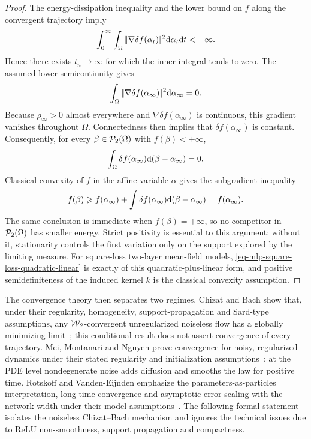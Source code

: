 \begin{proof}
	The energy-dissipation inequality and the lower bound on $f$ along the convergent trajectory imply
	\[
		\int_0^\infty
		\int_\Omega|\!| \nabla\delta f(\alpha_t) |\!|^2\mathrm{d}\alpha_t\mathrm{d} t
		<+\infty.
	\]
	Hence there exists $t_n\to\infty$ for which the inner integral tends to zero. The assumed lower semicontinuity gives
	\[
		\int_\Omega |\!| \nabla \delta f(\alpha_\infty) |\!|^2\mathrm{d}\alpha_\infty=0.
	\]
	Because $\rho_\infty>0$ almost everywhere and $\nabla\delta f(\alpha_\infty)$ is continuous, this gradient vanishes throughout $\Omega$. Connectedness then implies that $\delta f(\alpha_\infty)$ is constant. Consequently, for every $\beta\in\mathcal{P}_2(\Omega)$ with $f(\beta)<+\infty$,
	\[
		\int_\Omega\delta f(\alpha_\infty)\mathrm{d}(\beta-\alpha_\infty)=0.
	\]
	Classical convexity of $f$ in the affine variable $\alpha$ gives the subgradient inequality
	\[
		f(\beta)\geqslant f(\alpha_\infty)
		+
		\int \delta f(\alpha_\infty)\mathrm{d}(\beta-\alpha_\infty)
		= f(\alpha_\infty).
	\]
	The same conclusion is immediate when $f(\beta)=+\infty$, so no competitor in $\mathcal{P}_2(\Omega)$ has smaller energy. Strict positivity is essential to this argument: without it, stationarity controls the first variation only on the support explored by the limiting measure. For square-loss two-layer mean-field models, \eqref{eq-mlp-square-loss-quadratic-linear} is exactly of this quadratic-plus-linear form, and positive semidefiniteness of the induced kernel $k$ is the classical convexity assumption.
\end{proof}

The convergence theory then separates two regimes. Chizat and Bach show that, under their regularity, homogeneity, support-propagation and Sard-type assumptions, any $\operatorname{\mathcal{W}}_2$-convergent unregularized noiseless flow has a globally minimizing limit~\citep{ChizatBach2018OverparameterizedOT}; this conditional result does not assert convergence of every trajectory. Mei, Montanari and Nguyen prove convergence for noisy, regularized dynamics under their stated regularity and initialization assumptions~\citep{MeiMontanariNguyen2018MeanFieldNN}: at the PDE level nondegenerate noise adds diffusion and smooths the law for positive time. Rotskoff and Vanden-Eijnden emphasize the parameters-as-particles interpretation, long-time convergence and asymptotic error scaling with the network width under their model assumptions~\citep{RotskoffVandenEijnden2018Trainability}. The following formal statement isolates the noiseless Chizat--Bach mechanism and ignores the technical issues due to ReLU non-smoothness, support propagation and compactness.

